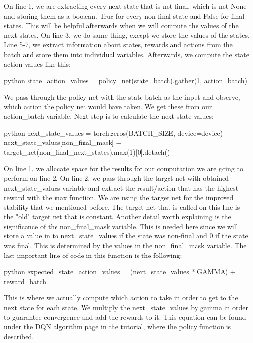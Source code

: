 \documentclass{article}
\numberwithin{equation}{section}
\numberwithin{equation}{section}
\begin{document}
On line 1, we are extracting every next state that is not final, which is not None and storing them as a boolean. True for every non-final state and False for final states. This will be helpful afterwards when we will compute the values of the next states. On line 3, we do same thing, except we store the values of the states. Line 5-7, we extract information about states, rewards and actions from the batch and store them into individual variables. Afterwards, we compute the state action values like this:

\begin{mintedbox}{python}
state_action_values = policy_net(state_batch).gather(1, action_batch)
\end{mintedbox}

We pass through the policy net with the state batch as the input and observe, which action the policy net would have taken. We get these from our action\_batch variable. Next step is to calculate the next state values:

\begin{mintedbox}{python}
next_state_values = torch.zeros(BATCH_SIZE, device=device)
next_state_values[non_final_mask] = target_net(non_final_next_states).max(1)[0].detach()
\end{mintedbox}

On line 1, we allocate space for the results for our computation we are going to perform on line 2. On line 2, we pass through the target net with obtained next\_state\_values variable and extract the result/action that has the highest reward with the max function. We are using the target net for the improved stability that we mentioned before. The target net that is called on this line is the "old" target net that is constant. Another detail worth explaining is the significance of the non\_final\_mask variable. This is needed here since we will store a value in to next\_state\_values if the state was non-final and 0 if the state was final. This is determined by the values in the non\_final\_mask variable. The last important line of code in this function is the following:
\begin{mintedbox}{python}
expected_state_action_values = (next_state_values * GAMMA) + reward_batch
\end{mintedbox} 
This is where we actually compute which action to take in order to get to the next state for each state. We multiply the next\_state\_values by gamma in order to guarantee convergence and add the rewards to it. This equation can be found under the DQN algorithm page in the tutorial, where the policy function is described. \\
\end{document}
